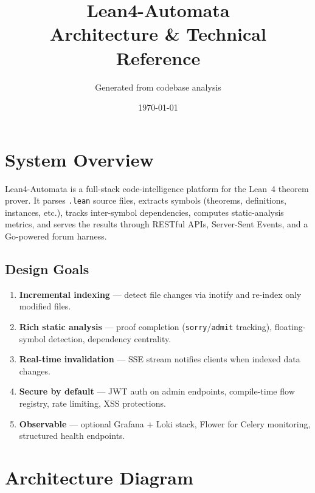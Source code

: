 \documentclass[11pt,a4paper]{article}
\title{%
  \textbf{Lean4-Automata} \\[0.3em]
  \Large Architecture \& Technical Reference
}
\author{Generated from codebase analysis}
\date{\today}
\begin{document}
\maketitle
\tableofcontents
\newpage

\section{System Overview}

Lean4-Automata is a full-stack code-intelligence platform for the Lean~4
theorem prover. It parses \texttt{.lean} source files, extracts symbols
(theorems, definitions, instances, etc.), tracks inter-symbol dependencies,
computes static-analysis metrics, and serves the results through RESTful
APIs, Server-Sent Events, and a Go-powered forum harness.

\subsection{Design Goals}
\begin{enumerate}[label=(\roman*)]
  \item \textbf{Incremental indexing} --- detect file changes via inotify and
        re-index only modified files.
  \item \textbf{Rich static analysis} --- proof completion (\texttt{sorry}/\texttt{admit}
        tracking), floating-symbol detection, dependency centrality.
  \item \textbf{Real-time invalidation} --- SSE stream notifies clients when
        indexed data changes.
  \item \textbf{Secure by default} --- JWT auth on admin endpoints, compile-time
        flow registry, rate limiting, XSS protections.
  \item \textbf{Observable} --- optional Grafana + Loki stack, Flower for
        Celery monitoring, structured health endpoints.
\end{enumerate}

\section{Architecture Diagram}
\end{document}
